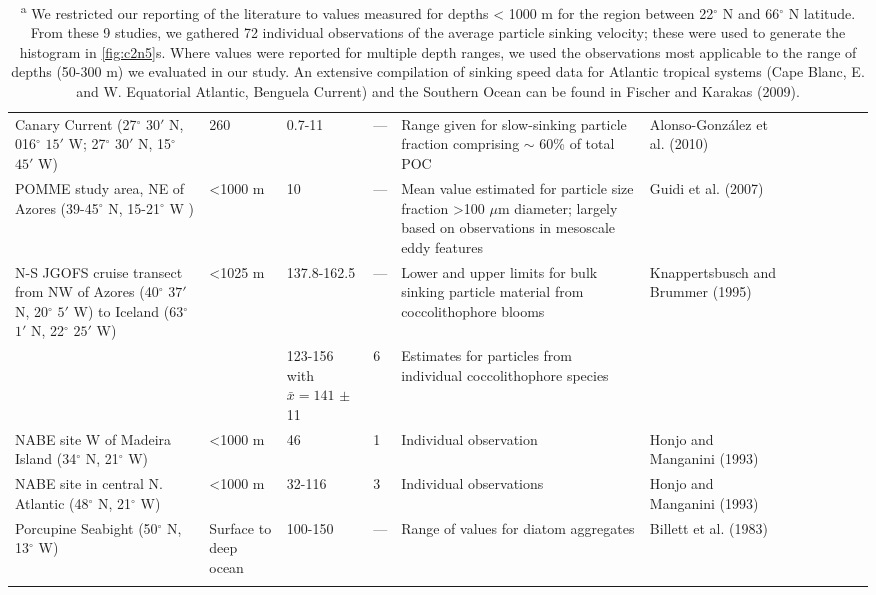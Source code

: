 \begin{landscape}
\begin{scriptsize}
\begin{singlespace}
\begin{flushleft}
\begin{longtable}{ Lp{.29\linewidth} Lp{.08\linewidth} Lp{.09\linewidth} Lp{.05\linewidth} Lp{.25\linewidth} Lp{.15\linewidth} }
Canary Current (27$^{\circ}$ $30'$ N, 016$^{\circ}$ $15'$ W; 27$^{\circ}$ $30'$ N, 15$^{\circ}$ $45'$ W) & 260 & 0.7-11 & --- & Range given for slow-sinking particle fraction comprising  $\sim$ 60\% of total POC & Alonso-Gonz\'{a}lez et al. (2010) \\

POMME study area, NE of Azores (39-45$^{\circ}$ N, 15-21$^{\circ}$ W ) & \textless 1000 m & 10 & --- & Mean value estimated for particle size fraction \textgreater 100 $\mu$m diameter; largely based on observations in mesoscale eddy features & Guidi et al. (2007) \\

N-S JGOFS cruise transect from NW of Azores (40$^{\circ}$ $37'$ N, 20$^{\circ}$ $5'$ W) to Iceland (63$^{\circ}$ $1'$ N, 22$^{\circ}$ $25'$ W) & \textless 1025 m & 137.8-162.5 & --- & Lower and upper limits for bulk sinking particle material from coccolithophore blooms & Knappertsbusch and Brummer (1995) \\

 &  & 123-156 with $\bar x = 141$ $\pm$ 11& 6 & Estimates for particles from individual coccolithophore species &  \\

NABE site W of Madeira Island (34$^{\circ}$ N, 21$^{\circ}$ W) & \textless 1000 m & 46 & 1 & Individual observation & Honjo and Manganini (1993) \\

NABE site in central N. Atlantic (48$^{\circ}$ N, 21$^{\circ}$ W) & \textless 1000 m & 32-116 & 3 & Individual observations & Honjo and Manganini (1993) \\

Porcupine Seabight (50$^{\circ}$ N, 13$^{\circ}$ W) & Surface to deep ocean & 100-150 & --- & Range of values for diatom aggregates & Billett et al. (1983) \\
\bottomrule
{}
\caption*{\textsuperscript{a} We restricted our reporting of the literature to values measured for depths \textless{} 1000 m for the region between 22$^{\circ}$ N and 66$^{\circ}$ N latitude. From these 9 studies, we gathered 72 individual observations of the average particle sinking velocity; these were used to generate the histogram in \autoref{fig:c2n5}s. Where values were reported for multiple depth ranges, we used the observations most applicable to the range of depths (50-300 m) we evaluated in our study. An extensive compilation of sinking speed data for Atlantic tropical systems (Cape Blanc, E. and W. Equatorial Atlantic, Benguela Current) and the Southern Ocean can be found in Fischer and Karakas (2009).}
\end{longtable}
\end{flushleft}
\end{singlespace}
\end{scriptsize}


\end{landscape}
